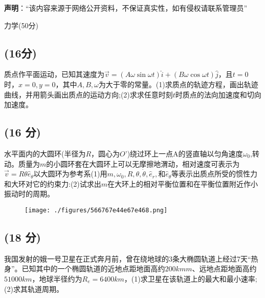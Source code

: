 
\textbf{声明}：“该内容来源于网络公开资料，不保证真实性，如有侵权请联系管理员”

力学(50分)
\subsection{(16分)}
质点作平面运动，已知其速度为$\vec{v} = (A \omega \sin \omega t) \hat{i} + (B \omega \cos \omega t) \hat{j}$，且$t=0$时，$x=0,y=0$，其中$A,B,\omega$为大于零的常量。(1)求质点的轨迹方程，画出轨迹曲线，并用箭头画出质点的运动方向;(2)求求任意时刻$t$时质点的法向加速度和切向
加速度。
\subsection{(16 分)}
水平面内的大圆环(半径为$R$，圆心为$O$’)绕过环上一点A的竖直轴以匀角速度$\omega_0$,转动。质量为$m$的小圆环套在大圆环上可以无摩擦地渭动，相对速度可表示为$\vec{v} =R\dot{\theta}\hat e_\theta$以大圆环为参考系(1)用$m,\omega_0,R,\theta,\dot{\theta},\hat e_r,$和$\hat e_\theta$等表示出质点所受的惯性力和大环对它的约束力:(2)试求出$m$在大环上的相对平衡位置和在平衡位置附近作小振动时的周期。
\begin{figure}[ht]
\centering
\texttt{[image: ./figures/566767e44e67e468.png]}
\caption{} \label{fig_PKU008_1}
\end{figure}
\subsection{(18 分)}
我国发射的娥一号卫星在正式奔月前，曾在绕地球的3条大椭圆轨道上经过7天“热身”。已知其中的一个椭圆轨道的近地点距地面高约$200kmm$、远地点距地面高约$51000km$，地球半径约为$R_e=6400km$，(1)求卫星在该轨道上的最大和最小速率;(2)求其轨道周期。



